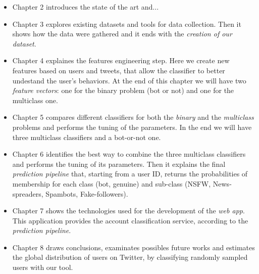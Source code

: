 \begin{itemize}
\item[\PencilRight] Chapter 2 introduces the state of the art and...

\item[\PencilRight] Chapter 3 explores existing datasets and tools for data collection. Then it shows how the data were gathered and it ends with the \emph{creation of our dataset}.

\item[\PencilRight] Chapter 4 explaines the features engineering step. Here we create new features based on users and tweets, that allow the classifier to better undestand the user's behaviors. At the end of this chapter we will have two \emph{feature vectors}: one for the binary problem (bot or not) and one for the multiclass one.

\item[\PencilRight] Chapter 5 compares different classifiers for both the \emph{binary} and the \emph{multiclass} problems and performs the tuning of the parameters. In the end we will have three multiclass classifiers and a bot-or-not one.

\item[\PencilRight] Chapter 6 identifies the best way to combine the three multiclass classifiers and performs the tuning of its parameters. Then it explains the final \emph{prediction pipeline} that, starting from a user ID, returns the probabilities of membership for each class (bot, genuine) and sub-class (NSFW, News-spreaders, Spambots, Fake-followers).

\item[\PencilRight] Chapter 7 shows the technologies used for the development of the \emph{web app}. This application provides the account classification service, according to the \emph{prediction pipeline}.

\item[\PencilRight] Chapter 8 draws conclusions, examinates possibles future works and estimates the global distribution of users on Twitter, by classifying randomly sampled users with our tool.



\end{itemize}

